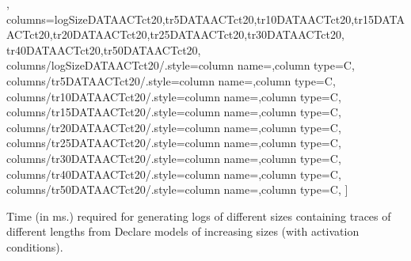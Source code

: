 \begin{small}
\begin{table}[t!]
\begin{center}
{{	},
	columns={logSizeDATAACTct20,tr5DATAACTct20,tr10DATAACTct20,tr15DATAACTct20,tr20DATAACTct20,tr25DATAACTct20,tr30DATAACTct20,
tr40DATAACTct20,tr50DATAACTct20},	
    columns/{logSizeDATAACTct20}/.style={column name={},column type=C},	
    columns/{tr5DATAACTct20}/.style={column name={},column type=C},
    columns/{tr10DATAACTct20}/.style={column name={},column type=C},
    columns/{tr15DATAACTct20}/.style={column name={},column type=C},
    columns/{tr20DATAACTct20}/.style={column name={},column type=C},
    columns/{tr25DATAACTct20}/.style={column name={},column type=C},
	columns/{tr30DATAACTct20}/.style={column name={},column type=C},
    columns/{tr40DATAACTct20}/.style={column name={},column type=C},
	columns/{tr50DATAACTct20}/.style={column name={},column type=C},
]{\fileTWENTYconstDATAACT}
}
\caption{Time (in ms.) required for generating logs of different sizes containing traces of different lengths from Declare models of increasing sizes (with activation conditions).}
\label{table:exp_results_real}
\end{center}
\end{table}
\end{small} 